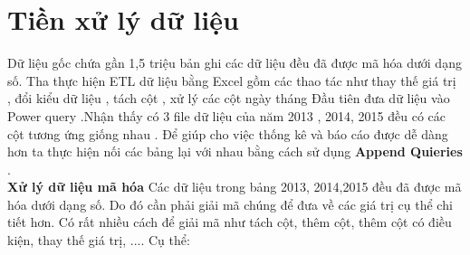 \section{Tiền xử lý dữ liệu}
Dữ liệu gốc chứa gần 1,5 triệu bản ghi các dữ liệu đều đã được mã hóa dưới dạng số. Tha thực hiện ETL dữ liệu bằng Excel  gồm các thao tác như thay thế giá trị , đổi kiểu dữ liệu , tách cột , xử lý các cột ngày tháng 
Đầu tiên đưa dữ liệu vào Power query .Nhận thấy có 3 file dữ liệu của năm 2013 , 2014, 2015 đều có các cột tương ứng giống nhau . Để giúp cho việc thống kê và báo cáo được dễ dàng hơn  ta thực hiện nối các bảng lại với nhau bằng cách sử dụng \textbf{Append Quieries } .
\\\textbf{Xử lý dữ liệu mã hóa }
Các dữ liệu trong bảng 2013, 2014,2015 đều đã được mã hóa dưới dạng số. Do đó cần phải giải mã chúng để đưa về các giá trị cụ thể chi tiết hơn. Có rất nhiều cách để giải mã như tách cột, thêm cột, thêm cột có
điều kiện, thay thế giá trị, .... Cụ thể:
